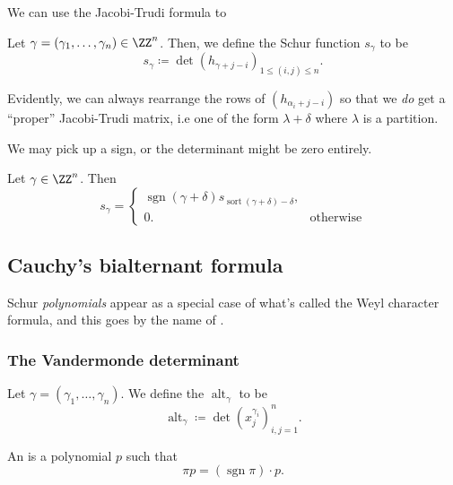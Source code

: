 \documentclass{article}
\DeclareMathOperator{\sgn}{sgn}
\DeclareMathOperator{\sort}{sort}
\DeclareMathOperator{\alt}{alt}
\begin{document}
We can use the Jacobi-Trudi formula to 

\begin{definition}
    Let $\gamma = (\gamma_1,\ldots,\gamma_n) \in \ZZ^n$.
    Then, we define the Schur function $s_\gamma$ to be
    \[
        s_\gamma \coloneq \det (h_{\gamma+j-i})_{1 \leq (i,j) \leq n}.
    \]
\end{definition}

Evidently, we can always rearrange the rows of $(h_{\alpha_i+j-i})$ so that we \textit{do} get a ``proper'' Jacobi-Trudi matrix, i.e one of the form $\lambda + \delta$ where $\lambda$ is a partition.

We may pick up a sign, or the determinant might be zero entirely.

\begin{theorem}
   Let $\gamma \in \ZZ^n$. 
   Then
   \[
       s_\gamma = \begin{cases}
           \sgn(\gamma + \delta)s_{\sort(\gamma+\delta)-\delta}, & \\
           0. & \text{otherwise}
       \end{cases}
   \]
\end{theorem}

\begin{example}
\end{example}

\subsection{Cauchy's bialternant formula}

Schur \textit{polynomials} appear as a special case of what's called the Weyl character formula, and this goes by the name of .

\subsubsection{The Vandermonde determinant}

\begin{definition}
    Let $\gamma = (\gamma_1,\ldots,\gamma_n)$.
    We define the  $\alt_\gamma$ to be 
    \[
        \alt_\gamma 
        \coloneq 
        \det \left(x_j^{\gamma_i}\right)_{i,j=1}^n.
    \]
\end{definition}

\begin{definition}
    An  is a polynomial $p$ such that
    \[
        \pi p
        = 
        (\sgn \pi) \cdot p.
    \]
\end{definition}
\end{document}
